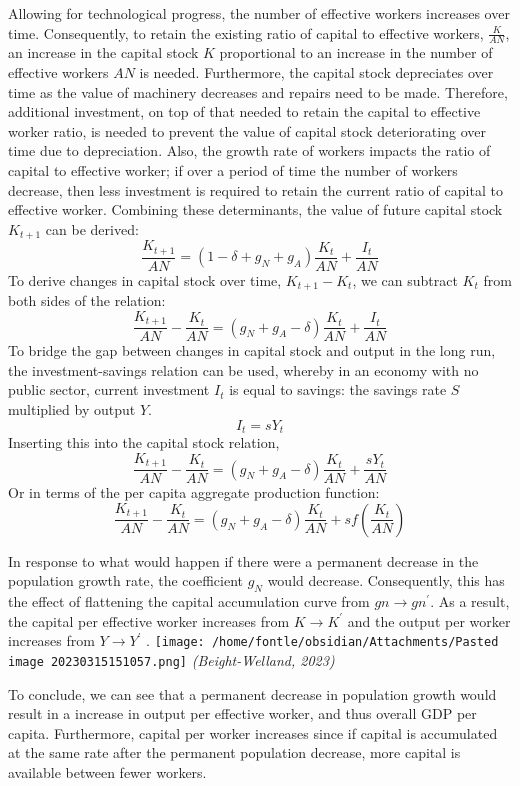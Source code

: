 \documentclass[
]{article}
\begin{document}
Allowing for technological progress, the number of effective workers
increases over time. Consequently, to retain the existing ratio of
capital to effective workers, {\(\frac{K}{AN}\)}, an increase in the
capital stock {\(K\)} proportional to an increase in the number of
effective workers {\(AN\)} is needed. Furthermore, the capital stock
depreciates over time as the value of machinery decreases and repairs
need to be made. Therefore, additional investment, on top of that needed
to retain the capital to effective worker ratio, is needed to prevent
the value of capital stock deteriorating over time due to depreciation.
Also, the growth rate of workers impacts the ratio of capital to
effective worker; if over a period of time the number of workers
decrease, then less investment is required to retain the current ratio
of capital to effective worker. Combining these determinants, the value
of future capital stock {\(K_{t + 1}\)} can be derived:
{\[\frac{K_{t + 1}}{AN} = (1 - \delta + g_{N} + g_{A})\frac{K_{t}}{AN} + \frac{I_{t}}{AN}\]}To
derive changes in capital stock over time, {\(K_{t + 1} - K_{t}\)}, we
can subtract {\(K_{t}\)} from both sides of the relation:
{\[\frac{K_{t + 1}}{AN} - \frac{K_{t}}{AN} = (g_{N} + g_{A} - \delta)\frac{K_{t}}{AN} + \frac{I_{t}}{AN}\]}To
bridge the gap between changes in capital stock and output in the long
run, the investment-savings relation can be used, whereby in an economy
with no public sector, current investment {\(I_{t}\)} is equal to
savings: the savings rate {\(S\)} multiplied by output {\(Y\)}.
{\[I_{t} = sY_{t}\]}Inserting this into the capital stock relation,
{\[\frac{K_{t + 1}}{AN} - \frac{K_{t}}{AN} = (g_{N} + g_{A} - \delta)\frac{K_{t}}{AN} + \frac{sY_{t}}{AN}\]}Or
in terms of the per capita aggregate production function:
{\[\frac{K_{t + 1}}{AN} - \frac{K_{t}}{AN} = (g_{N} + g_{A} - \delta)\frac{K_{t}}{AN} + sf\left( \frac{K_{t}}{AN} \right)\]}

In response to what would happen if there were a permanent decrease in
the population growth rate, the coefficient {\(g_{N}\)} would decrease.
Consequently, this has the effect of flattening the capital accumulation
curve from {\(gn \rightarrow gn^{\prime}\)}. As a result, the capital
per effective worker increases from {\(K \rightarrow K^{\prime}\)} and
the output per worker increases from {\(Y \rightarrow Y^{\prime}\)} .
\texttt{[image: /home/fontle/obsidian/Attachments/Pasted image 20230315151057.png]}
\emph{(Beight-Welland, 2023)}

To conclude, we can see that a permanent decrease in population growth
would result in a increase in output per effective worker, and thus
overall GDP per capita. Furthermore, capital per worker increases since
if capital is accumulated at the same rate after the permanent
population decrease, more capital is available between fewer workers.
\end{document}
